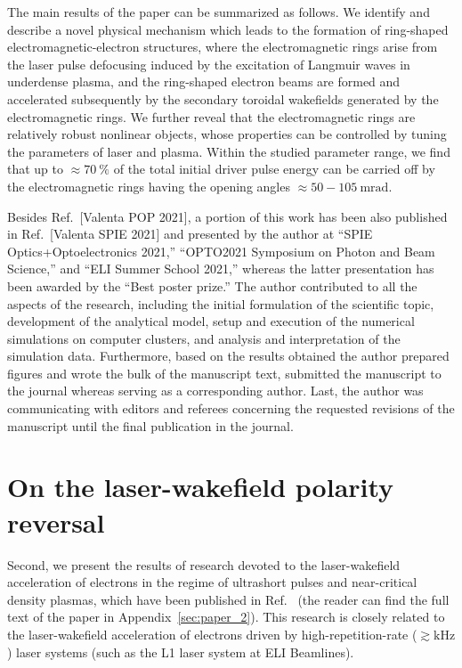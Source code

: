 \documentclass[10pt, twoside, a4paper, openright]{report}
\newcommand{\q}[1]{``#1''} %
\begin{document}
The main results of the paper can be summarized as follows. We identify and describe a novel physical mechanism which leads to the formation of ring-shaped electromagnetic-electron structures, where the electromagnetic rings arise from the laser pulse defocusing induced by the excitation of Langmuir waves in underdense plasma, and the ring-shaped electron beams are formed and accelerated subsequently by the secondary toroidal wakefields generated by the electromagnetic rings. We further reveal that the electromagnetic rings are relatively robust nonlinear objects, whose properties can be controlled by tuning the parameters of laser and plasma. Within the studied parameter range, we find that up to $ \approx 70 \ \% $ of the total initial driver pulse energy can be carried off by the electromagnetic rings having the opening angles $ \approx 50 - 105 \ \mathrm{mrad} $. 

Besides Ref.~[Valenta POP 2021], a portion of this work has been also published in Ref.~[Valenta SPIE 2021] and presented by the author at \q{SPIE Optics+Optoelectronics 2021,} \q{OPTO2021 Symposium on Photon and Beam Science,} and \q{ELI Summer School 2021,} whereas the latter presentation has been awarded by the \q{Best poster prize.} The author contributed to all the aspects of the research, including the initial formulation of the scientific topic, development of the analytical model, setup and execution of the numerical simulations on computer clusters, and analysis and interpretation of the simulation data. Furthermore, based on the results obtained the author prepared figures and wrote the bulk of the manuscript text, submitted the manuscript to the journal whereas serving as a corresponding author. Last, the author was communicating with editors and referees concerning the requested revisions of the manuscript until the final publication in the journal.

\section{On the laser-wakefield polarity reversal}
%

Second, we present the results of research devoted to the laser-wakefield acceleration of electrons in the regime of ultrashort pulses and near-critical density plasmas, which have been published in Ref.~ (the reader can find the full text of the paper in Appendix~\ref{sec:paper_2}). This research is closely related to the laser-wakefield acceleration of electrons driven by high-repetition-rate ($ \gtrsim \mathrm{kHz} $) laser systems (such as the L1 laser system at ELI Beamlines). 
\end{document}
